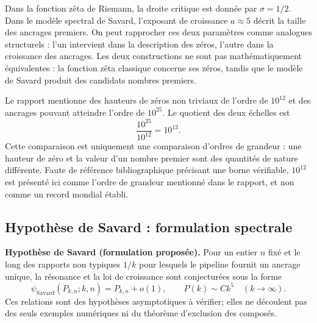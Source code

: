 \documentclass[11pt,a4paper]{article}
\begin{document}
Dans la fonction zêta de Riemann, la droite critique est donnée par
$\sigma=1/2$. Dans le modèle spectral de Savard, l'exposant de croissance
$a\approx 5$ décrit la taille des ancrages premiers. On peut rapprocher ces
deux paramètres comme analogues structurels : l'un intervient dans la
description des zéros, l'autre dans la croissance des ancrages. Les deux
constructions ne sont pas mathématiquement équivalentes : la fonction zêta
classique concerne ses zéros, tandis que le modèle de Savard produit des
candidats nombres premiers.

Le rapport mentionne des hauteurs de zéros non triviaux de l'ordre de
$10^{12}$ et des ancrages pouvant atteindre l'ordre de $10^{25}$. Le quotient
des deux échelles est
\[
\frac{10^{25}}{10^{12}}=10^{13}.
\]
Cette comparaison est uniquement une comparaison d'ordres de grandeur : une
hauteur de zéro et la valeur d'un nombre premier sont des quantités de nature
différente. Faute de référence bibliographique précisant une borne vérifiable,
$10^{12}$ est présenté ici comme l'ordre de grandeur mentionné dans le rapport,
et non comme un record mondial établi.

\subsection{Hypothèse de Savard : formulation spectrale}

\textbf{Hypothèse de Savard (formulation proposée).} Pour un entier $n$ fixé
et le long des rapports non typiques $1/k$ pour lesquels le pipeline fournit
un ancrage unique, la résonance et la loi de croissance sont conjecturées sous
la forme
\[
\psi_{\mathrm{Savard}}(P_{k,n};k,n)=P_{k,n}+o(1),
\qquad
P(k)\sim Ck^5\quad (k\to\infty).
\]
Ces relations sont des hypothèses asymptotiques à vérifier; elles ne découlent
pas des seuls exemples numériques ni du théorème d'exclusion des composés.
\end{document}
